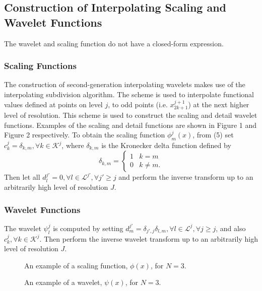 \documentclass[11pt]{article}
\begin{document}
\subsection{Construction of Interpolating Scaling and Wavelet Functions}
The wavelet and scaling function do not have a closed-form expression.

\subsubsection{Scaling Functions}
The construction of second-generation interpolating wavelets makes use of the interpolating subdivision algorithm. 
The scheme is used to interpolate functional values defined at points on level $j$, to odd points (i.e. $x_{2k+1}^{j+1}$) 
at the next higher level of resolution. This scheme is used to construct the scaling and detail wavelet functions. 
Examples of the scaling and detail functions are shown in Figure 1 and Figure 2 respectively.
To obtain the scaling function $\phi_{m}^{j}(x)$, from (5) set $c_{k}^{j}=\delta_{k,m}, \forall k \in \mathcal{K}^j$, where $\delta_{k,m}$ is the Kronecker delta function defined by
\[ \delta_{k,m} = \begin{cases} 
      1 & k=m \\
      0 & k \neq m.
   \end{cases}
\]
Then let all $d_{l}^{j'}=0, \forall l \in \mathcal{L}^{j'}, \forall j' \geq j$ and perform the inverse transform 
up to an arbitrarily high level of resolution $J$. 

\subsubsection{Wavelet Functions}
The wavelet $\psi_{l}^{j}$ is computed by setting $d_{m}^{j'} = \delta_{j',j} \delta_{l,m}, 
\forall l \in \mathcal{L}^{j}, \forall j \geq j$, 
and also $c_{k}^{j}, \forall k \in \mathcal{K}^j$. Then perform the inverse wavelet transform up to an 
arbitrarily high level of resolution $J$.

\begin{figure}
	\center
	
	\caption{An example of a scaling function, $\phi(x)$, for $N=3$.}
\end{figure}

\begin{figure}
	\center
	
	\caption{An example of a wavelet, $\psi(x)$, for $N=3$.}
\end{figure}
\end{document}
